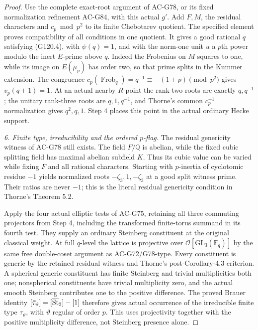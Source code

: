 \begin{proof}
Use the complete exact-root argument of AC-G78, or its fixed
normalization refinement AC-G84, with this actual $g'$.
Add $F,M$, the residual characters and $c_p\bmod p^2$ to its
finite Chebotarev quotient.  The specified element proves
compatibility of all conditions in one quotient.
It gives a good rational $q$ satisfying (G120.4), with
$\psi(q)=1$, and with the norm-one unit $u$ a $p$th power
modulo the inert $E$-prime above $q$.
Indeed the Frobenius on $M$ squares to one, while its image
on $E(\mu_p)$ has order two, so that prime splits in the
Kummer extension.  The congruence
$c_p(\operatorname{Frob}_q)=q^{-1}\equiv-(1+p)\pmod{p^2}$
gives $v_p(q+1)=1$.
At an actual nearby $R$-point the rank-two roots are exactly
$q,q^{-1}$; the unitary rank-three roots are $q,1,q^{-1}$,
and Thorne's common $c_p^{-1}$ normalization gives $q^2,q,1$.
Step 4 places this point in the actual ordinary Hecke support.

\emph{6. Finite type, irreducibility and the ordered $p$-flag.}
The residual genericity witness of AC-G78 still exists.
The field $F/\mathbb Q$ is abelian, while the fixed cubic
splitting field has maximal abelian subfield $K$.
Thus its cubic value can be varied while fixing $F$ and all
rational characters.  Starting with $p$-inertia of cyclotomic
residue $-1$ yields normalized roots
$-\zeta_3,1,-\zeta_3$ at a good split witness prime.
Their ratios are never $-1$; this is the literal residual
genericity condition in Thorne's Theorem 5.2.

Apply the four actual elliptic tests of AC-G75, retaining all
three commuting projectors from Step 4, including the transformed
finite-torus summand in its fourth test.
They supply an ordinary Steinberg constituent at the original
classical weight.  At full $q$-level the lattice is projective
over $\mathcal O[\mathrm{GL}_3(\mathbb F_q)]$ by the same
free double-coset argument as AC-G72/G78-type.
Every constituent is generic by the retained residual witness
and Thorne's post-Corollary-4.3 criterion.
A spherical generic constituent has finite Steinberg and trivial
multiplicities both one; nonspherical constituents have trivial
multiplicity zero, and the actual smooth Steinberg contributes
one to the positive difference.
The proved Brauer identity
$[\bar\tau_{\vartheta}]=[\overline{\rm St}_3]-[1]$
therefore gives actual occurrence of the irreducible finite
type $\tau_{\vartheta}$, with $\vartheta$ regular of order $p$.
This uses projectivity together with the positive multiplicity
difference, not Steinberg presence alone.


\end{proof}

